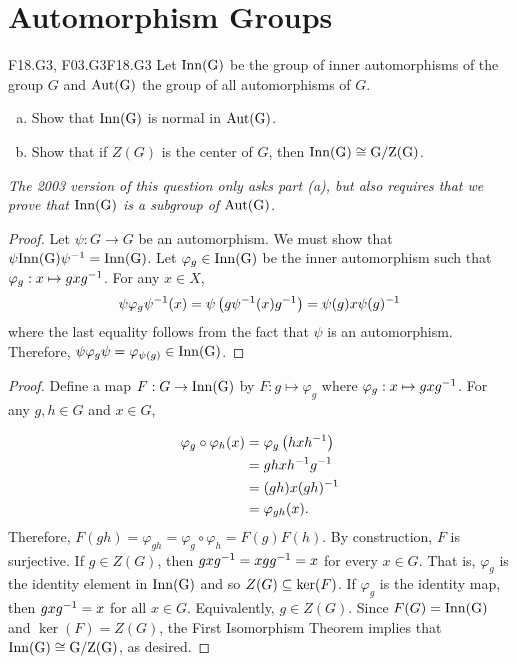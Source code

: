 \documentclass[../AlgebraQualSolutions.tex]{subfiles}
\begin{document}
\section{Automorphism Groups}

\begin{prob}{F18.G3, F03.G3}{F18.G3}
    Let $\rm{Inn}(G)$ be the group of inner automorphisms of the group $G$ and $\rm{Aut}(G)$ the group of all automorphisms of $G$.
    \begin{enumerate}[(a)]
        \item Show that $\rm{Inn}(G)$ is normal in $\rm{Aut}(G)$.
        \item Show that if $Z(G)$ is the center of $G$, then $\rm{Inn}(G) \cong G/Z(G)$.
    \end{enumerate}
\end{prob}

\emph{The 2003 version of this question only asks part (a), but also requires that we prove that $\rm{Inn}(G)$ is a subgroup of $\rm{Aut}(G)$.}

\begin{proof}
    Let $\psi: G\to G$ be an automorphism. We must show that $\psi \rm{Inn}(G) \psi^{-1} = \rm{Inn}(G)$. Let $\varphi_g \in \rm{Inn}(G)$ be the inner automorphism such that $\varphi_g: x \mapsto gxg^{-1}$. For any $x \in X$,
            \[\psi\varphi_g\psi^{-1}(x) = \psi\left(g\psi^{-1}(x)g^{-1}\right) = \psi(g)x\psi(g)^{-1}\]
    where the last equality follows from the fact that $\psi$ is an automorphism. Therefore, $\psi\varphi_g\psi = \varphi_{\psi(g)} \in \rm{Inn}(G)$.
\end{proof}

\begin{proof}
    Define a map $F: G \to \rm{Inn}(G)$ by $F: g \mapsto \varphi_g$ where $\varphi_g: x \mapsto gxg^{-1}$. For any $g,h \in G$ and $x \in G$,

        \begin{align*}
            \varphi_g\circ\varphi_h(x) &= \varphi_g\left(hxh^{-1}\right)\\
            &= ghxh^{-1} g^{-1}\\
            &= (gh)x(gh)^{-1}\\
            &= \varphi_{gh}(x).
        \end{align*}
    Therefore, $F(gh) = \varphi_{gh} = \varphi_g\circ \varphi_h = F(g)F(h)$. By construction, $F$ is surjective. If $g \in Z(G)$, then $gxg^{-1} = xgg^{-1} = x$ for every $x \in G$. That is, $\varphi_g$ is the identity element in $\rm{Inn}(G)$ and so $Z(G) \subseteq \ker(F)$. If $\varphi_g$ is the identity map, then $gxg^{-1} = x$ for all $x \in G$. Equivalently, $g \in Z(G)$. Since $F(G) = \rm{Inn}(G)$ and $\ker(F) = Z(G)$, the First Isomorphism Theorem implies that $\rm{Inn}(G) \cong G/Z(G)$, as desired.
\end{proof}
\end{document}
